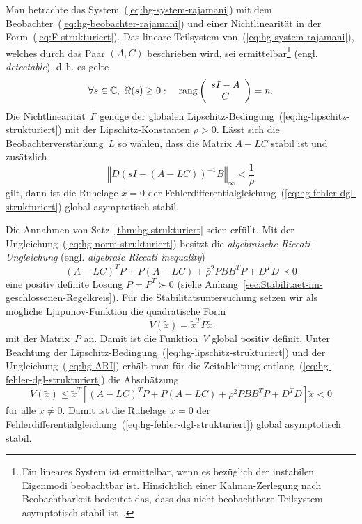 \begin{theorem}
\label{thm:hg-strukturiert}Man betrachte das System~(\ref{eq:hg-system-rajamani})
mit dem Beobachter~(\ref{eq:hg-beobachter-rajamani}) und einer Nichtlinearität
in der Form~(\ref{eq:F-strukturiert}). Das lineare Teilsystem von~(\ref{eq:hg-system-rajamani}),
welches durch das Paar $(A,C)$ beschrieben wird, sei ermittelbar\footnote{Ein lineares System ist ermittelbar, wenn es bezüglich der instabilen
Eigenmodi beobachtbar ist. Hinsichtlich einer Kalman-Zerlegung nach
Beobachtbarkeit bedeutet das, dass das nicht beobachtbare Teilsystem
asymptotisch stabil ist~\cite{ludyk1995-2,lunze-rt2}.} (engl. \emph{detectable}), d.\,h. es gelte
\[
\forall s\in{\mathbb{C}},\;\Re(s)\geq0:\quad{\operatorname{rang}}\left(\begin{array}{c}
sI-A\\
C
\end{array}\right)=n.
\]
Die Nichtlinearität~$\bar{F}$ genüge der globalen Lipschitz-Bedingung~(\ref{eq:hg-lipschitz-strukturiert})
mit der Lipschitz-Konstanten $\bar{\rho}>0$. Lässt sich die Beobachterverstärkung~$L$
so wählen, dass die Matrix $A-LC$ stabil ist und zusätzlich
\begin{equation}
\left\Vert D\left(sI-(A-LC)\right)^{-1}B\right\Vert _{\infty}<\frac{1}{\bar{\rho}}\label{eq:hg-norm-strukturiert}
\end{equation}
gilt, dann ist die Ruhelage $\tilde{x}=0$ der Fehlerdifferentialgleichung~(\ref{eq:hg-fehler-dgl-strukturiert})
global asymptotisch stabil.

\end{theorem}
\begin{proofsketch}Die Annahmen von Satz~\ref{thm:hg-strukturiert}
seien erfüllt. Mit der Ungleichung~(\ref{eq:hg-norm-strukturiert})
besitzt die \emph{algebraische Riccati-Ungleichung}
(engl. \emph{algebraic Riccati inequality})
\begin{equation}
(A-LC)^{T}P+P(A-LC)+\bar{\rho}^{2}PBB^{T}P+D^{T}D\prec0\label{eq:hg-ARI}
\end{equation}
eine positiv definite Lösung $P=P^{T}\succ0$ (siehe Anhang~\ref{sec:Stabilitaet-im-geschlossenen-Regelkreis}).
Für die Stabilitätsuntersuchung setzen wir als mögliche Ljapunov-Funktion
die quadratische Form 
\[
V(\tilde{x})=\tilde{x}^{T}P\tilde{x}
\]
mit der Matrix~$P$ an. Damit ist die Funktion~$V$ global positiv
definit. Unter Beachtung der Lipschitz-Bedingung~(\ref{eq:hg-lipschitz-strukturiert})
und der Ungleichung~(\ref{eq:hg-ARI}) erhält man für die Zeitableitung
entlang~(\ref{eq:hg-fehler-dgl-strukturiert}) die Abschätzung
\[
\dot{V}(\tilde{x})\leq\tilde{x}^{T}\left[(A-LC)^{T}P+P(A-LC)+\bar{\rho}^{2}PBB^{T}P+D^{T}D\right]\tilde{x}<0
\]
für alle $\tilde{x}\neq0$. Damit ist die Ruhelage $\tilde{x}=0$
der Fehlerdifferentialgleichung~(\ref{eq:hg-fehler-dgl-strukturiert})
global asymptotisch stabil.\end{proofsketch}


